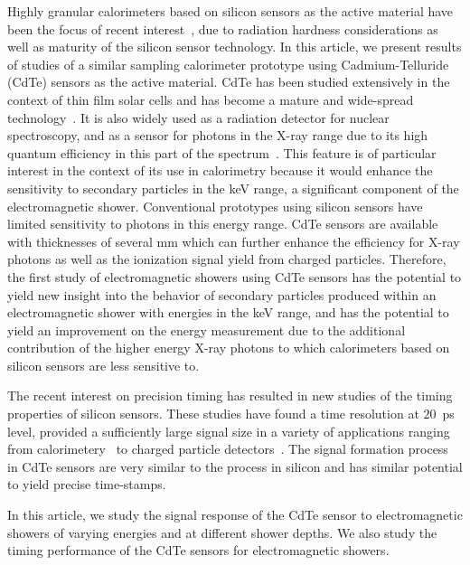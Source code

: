 Highly granular calorimeters based on silicon sensors as the active material 
have been the focus of recent interest~\cite{Adloff:2009,Butler:2020886}, due to
radiation hardness considerations as well as maturity of the silicon sensor
technology. In this article, we present results of studies of a similar
sampling calorimeter prototype using Cadmium-Telluride (CdTe) sensors as the 
active material. CdTe has been studied extensively in the context
of thin film solar cells and has become a mature and wide-spread
technology~\cite{cdtegeneric}. It is also widely used as a radiation
detector for nuclear spectroscopy, and as a sensor for photons in the X-ray range 
due to its high quantum efficiency in this part of the 
spectrum~\cite{cdtesensorsgeneric,cdtesensors1,cdtesensors2,cdtesensors3}.
This feature is of particular interest in the context of its use
in calorimetry because it would enhance the sensitivity to secondary particles in the keV range, 
a significant component of the electromagnetic shower. Conventional prototypes 
using silicon sensors have limited sensitivity to photons in this energy range. 
CdTe sensors are available with thicknesses of several mm which can further enhance the 
efficiency for X-ray photons as well as the ionization signal yield from charged particles.
Therefore, the first study of electromagnetic
showers using CdTe sensors has the potential to yield new insight
into the behavior of secondary particles produced within an 
electromagnetic shower with energies in the keV range, and has the potential
to yield an improvement on the energy measurement due to
the additional contribution of the higher energy X-ray photons to which 
calorimeters based on silicon sensors are less sensitive to.

The recent interest on precision timing has resulted in new studies of 
the timing properties of silicon sensors. 
These studies have found a time resolution 
at $20$~ps level, provided a sufficiently large signal size
in a variety of applications ranging from calorimetery~\cite{SiliconTiming} to 
charged particle detectors~\cite{santacruz}. The signal formation process
in CdTe sensors are very similar to the process in silicon and has 
similar potential to yield precise time-stamps.

In this article, we study the signal response of the CdTe sensor to electromagnetic
showers of varying energies and at different shower depths. We also study the timing
performance of the CdTe sensors for electromagnetic showers.

